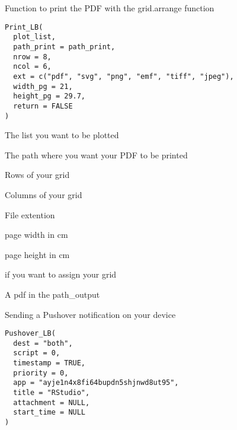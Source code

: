 \documentclass[a4paper]{book}
\begin{document}
%
\begin{Description}
Function to print the PDF with the grid.arrange function
\end{Description}
%
\begin{Usage}
\begin{verbatim}
Print_LB(
  plot_list,
  path_print = path_print,
  nrow = 8,
  ncol = 6,
  ext = c("pdf", "svg", "png", "emf", "tiff", "jpeg"),
  width_pg = 21,
  height_pg = 29.7,
  return = FALSE
)
\end{verbatim}
\end{Usage}
%
\begin{Arguments}
\begin{ldescription}
\item[\code{plot\_list}] The list you want to be plotted

\item[\code{path\_print}] The path where you want your PDF to be printed

\item[\code{nrow}] Rows of your grid

\item[\code{ncol}] Columns of your grid

\item[\code{ext}] File extention

\item[\code{width\_pg}] page width in cm

\item[\code{height\_pg}] page height in cm

\item[\code{return}] if you want to assign your grid
\end{ldescription}
\end{Arguments}
%
\begin{Value}
A pdf in the path\_output
\end{Value}
%
\begin{Description}
Sending a Pushover notification on your device
\end{Description}
%
\begin{Usage}
\begin{verbatim}
Pushover_LB(
  dest = "both",
  script = 0,
  timestamp = TRUE,
  priority = 0,
  app = "ayje1n4x8fi64bupdn5shjnwd8ut95",
  title = "RStudio",
  attachment = NULL,
  start_time = NULL
)
\end{verbatim}
\end{Usage}
\end{document}

